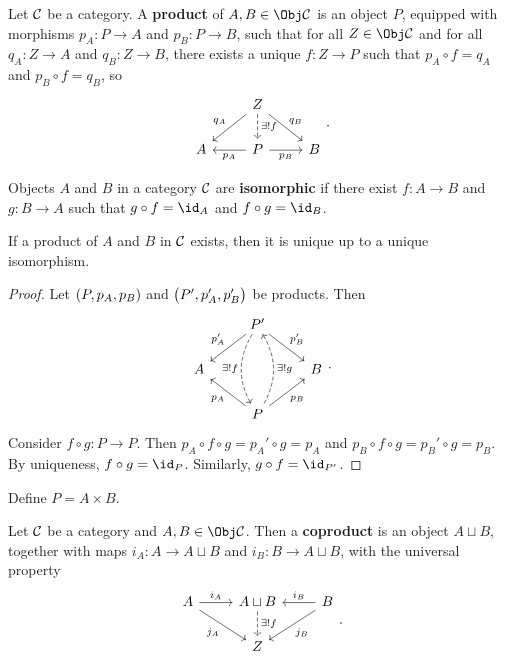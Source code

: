
\begin{definition}
Let $ \mathcal{C} $ be a category. A \textbf{product} of $ A, B \in \Obj \CCC $ is an object $ P $, equipped with morphisms $ p_A : P \to A $ and $ p_B : P \to B $, such that for all $ Z \in \Obj \CCC $ and for all $ q_A : Z \to A $ and $ q_B : Z \to B $, there exists a unique $ f : Z \to P $ such that $ p_A \circ f = q_A $ and $ p_B \circ f = q_B $, so
$$
\begin{tikzcd}
& Z \arrow{dl}[swap]{q_A} \arrow[dashed]{d}{\exists !f} \arrow{dr}{q_B} & \\
A & P \arrow{l}{p_A} \arrow{r}[swap]{p_B} & B
\end{tikzcd}.
$$
\end{definition}

\begin{definition}
Objects $ A $ and $ B $ in a category $ \mathcal{C} $ are \textbf{isomorphic} if there exist $ f : A \to B $ and $ g : B \to A $ such that $ g \circ f = \id_A $ and $ f \circ g = \id_B $.
\end{definition}

\begin{proposition}
If a product of $ A $ and $ B $ in $ \mathcal{C} $ exists, then it is unique up to a unique isomorphism.
\end{proposition}

\begin{proof}
Let $ \br{P, p_A, p_B} $ and $ \br{P', p_A', p_B'} $ be products. Then
$$
\begin{tikzcd}
& P' \arrow{dl}[swap]{p_A'} \arrow[bend right=30, dashed]{dd}[swap]{\exists !f} \arrow{dr}{p_B'} & \\
A & & B \\
& P \arrow{ul}{p_A} \arrow[bend right=30, dashed]{uu}[swap]{\exists !g} \arrow{ur}[swap]{p_B} &
\end{tikzcd}.
$$
Consider $ f \circ g : P \to P $. Then $ p_A \circ f \circ g = p_A' \circ g = p_A $ and $ p_B \circ f \circ g = p_B' \circ g = p_B $. By uniqueness, $ f \circ g = \id_P $. Similarly, $ g \circ f = \id_{P'} $.
\end{proof}

\begin{notation}
Define $ P = A \times B $.
\end{notation}

\begin{definition}
Let $ \mathcal{C} $ be a category and $ A, B \in \Obj \CCC $. Then a \textbf{coproduct} is an object $ A \sqcup B $, together with maps $ i_A : A \to A \sqcup B $ and $ i_B : B \to A \sqcup B $, with the universal property
$$
\begin{tikzcd}
A \arrow{r}{i_A} \arrow{dr}[swap]{j_A} & A \sqcup B \arrow[dashed]{d}{\exists !f} & B \arrow{l}[swap]{i_B} \arrow{dl}{j_B} \\
& Z &
\end{tikzcd}.
$$
\end{definition}

